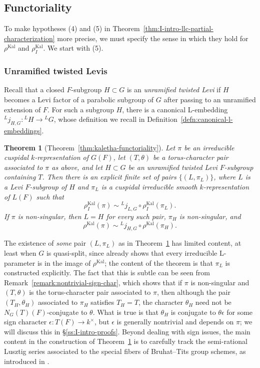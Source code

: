\documentclass[reqno]{amsart}
\numberwithin{equation}{subsection}
\newcommand{\co}{\colon}
\newcommand{\ld}{{}^L}
\DeclareMathOperator{\Kal}{Kal}
\newtheorem{thm}{Theorem}[subsection]
\theoremstyle{remark}
\numberwithin{equation}{subsection}
\numberwithin{figure}{subsection}
\begin{document}
\subsection{Functoriality}\label{ssec:II-intro-functoriality}

To make hypotheses (4) and (5) in Theorem~\ref{thm:I-intro-llc-partial-characterization} more precise, we must specify the sense in which they hold for $\rho^{\Kal}$ and $\rho_I^{\Kal}$. We start with (5).

\subsubsection{Unramified twisted Levis}
Recall that a closed $F$-subgroup $H \subset G$ is an \emph{unramified twisted Levi} if $H$ becomes a Levi factor of a parabolic subgroup of $G$ after passing to an unramified extension of $F$. For such a subgroup $H$, there is a canonical L-embedding $\ld j_{H,G}\co \ld H \to \ld G$, whose definition we recall in Definition~\ref{defn:canonical-l-embeddings}.

\begin{thm}[Theorem~\ref{thm:kaletha-functoriality}]\label{thm:I-intro-kaletha-unramified-twisted-levi}
    Let $\pi$ be an irreducible cuspidal $k$-representation of $G(F)$, let $(T, \theta)$ be a torus-character pair associated to $\pi$ as above, and let $H \subset G$ be an unramified twisted Levi $F$-subgroup containing $T$. Then there is an explicit finite set of pairs $\{(L, \pi_L)\}$, where $L$ is a Levi $F$-subgroup of $H$ and $\pi_L$ is a cuspidal irreducible smooth $k$-representation of $L(F)$ such that
    \[
    \rho_I^{\Kal}(\pi) \sim \ld j_{L,G} \circ \rho_I^{\Kal}(\pi_L).
    \]
    If $\pi$ is non-singular, then $L = H$ for every such pair, $\pi_H$ is non-singular, and
    \[
    \rho^{\Kal}(\pi) \sim \ld j_{H,G} \circ \rho^{\Kal}(\pi_H).
    \]
\end{thm}

The existence of \emph{some} pair $(L, \pi_L)$ as in Theorem~\ref{thm:I-intro-kaletha-unramified-twisted-levi} has limited content, at least when $G$ is quasi-split, since \cite{Kal21b} already shows that every irreducible L-parameter is in the image of $\rho^{\Kal}$; the content of the theorem is that $\pi_L$ is constructed explicitly. The fact that this is subtle can be seen from Remark~\ref{remark:nontrivial-sign-char}, which shows that if $\pi$ is non-singular and $(T, \theta)$ is the torus-character pair associated to $\pi$, then although the pair $(T_H, \theta_H)$ associated to $\pi_H$ satisfies $T_H = T$, the character $\theta_H$ need not be $N_G(T)(F)$-conjugate to $\theta$. What is true is that $\theta_H$ is conjugate to $\theta\epsilon$ for some sign character $\epsilon\co T(F) \to k^\times$, but $\epsilon$ is generally nontrivial and depends on $\pi$; we will discuss this in \S\ref{ss:I-intro-proofs}. Beyond dealing with sign issues, the main content in the construction of Theorem~\ref{thm:I-intro-kaletha-unramified-twisted-levi} is to carefully track the semi-rational Lusztig series associated to the special fibers of Bruhat--Tits group schemes, as introduced in \cite[\S 2.8]{Cot26b}.
\end{document}
